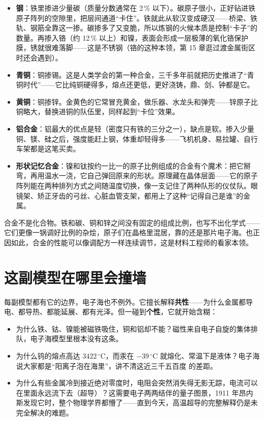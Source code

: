 \begin{itemize}[itemsep=2pt]
\item \textbf{钢}：铁里掺进少量碳（质量分数通常在 2\,\% 以下）。碳原子很小，正好钻进铁原子阵列的空隙里，把层间通道“卡住”。铁就此从软汉变成硬汉——桥梁、铁轨、钢筋全靠这一掺。碳掺多了又变脆，所以炼钢的火候本质是控制“卡子”的数量。再掺入铬（约 12\,\% 以上）和镍，表面会形成一层极薄的氧化铬保护膜，锈就很难落脚——这是不锈钢（铬的这种本领，第 15 章逛过渡金属街区时还会遇到）。
\item \textbf{青铜}：铜掺锡。这是人类学会的第一种合金，三千多年前就把历史推进了“青铜时代”——它比纯铜硬得多，熔点还更低，更好浇铸，鼎、剑、钟都是它。
\item \textbf{黄铜}：铜掺锌。金黄色的它常冒充黄金，做乐器、水龙头和弹壳——锌原子比铜略大，替换进铜的队伍里，同样起到“卡位”效果。
\item \textbf{铝合金}：铝最大的优点是轻（密度只有铁的三分之一），缺点是软。掺入少量铜、镁、硅之后，强度能赶上钢，体重却轻得多——飞机机身、易拉罐、自行车架都是这笔买卖。
\item \textbf{形状记忆合金}：镍和钛按约一比一的原子比例组成的合金有个魔术：把它掰弯，再用温水一浇，它自己弹回原来的形状。原理藏在晶体层面——它的原子阵列能在两种排列方式之间随温度切换，像一支记住了两种队形的仪仗队。眼镜架、矫正牙齿的弓丝、心脏血管支架，都用上了这种“记得自己是谁”的金属。
\end{itemize}

合金不是化合物。铁和碳、铜和锌之间没有固定的组成比例，也写不出化学式——它们更像一锅调好比例的杂烩，原子们在晶格里混居，靠的还是那片电子海。也正因如此，合金的性能可以像调配方一样连续调节，这是材料工程师的看家本领。

\section{这副模型在哪里会撞墙}

每副模型都有它的边界，电子海也不例外。它擅长解释\textbf{共性}——为什么金属都导电、都导热、都能延展、都有光泽。但一碰到\textbf{个性}，它就开始含糊：

\begin{itemize}[itemsep=2pt]
\item 为什么铁、钴、镍能被磁铁吸住，铜和铝却不能？磁性来自电子自旋的集体排队，电子海模型里根本没有这条。
\item 为什么钨的熔点高达 $3422\,^{\circ}\mathrm{C}$，而汞在 $-39\,^{\circ}\mathrm{C}$ 就熔化、常温下是液体？电子海说大家都是“阳离子泡在海里”，讲不清这近三千五百度 的差距。
\item 为什么有些金属冷到接近绝对零度时，电阻会突然消失得无影无踪，电流可以在里面永远流下去（超导）？这需要电子两两结伴的量子图景，1911 年昂内斯发现它时，整个物理学界都懵了——直到今天，高温超导的完整解释仍是未完全解决的难题。
\end{itemize}

